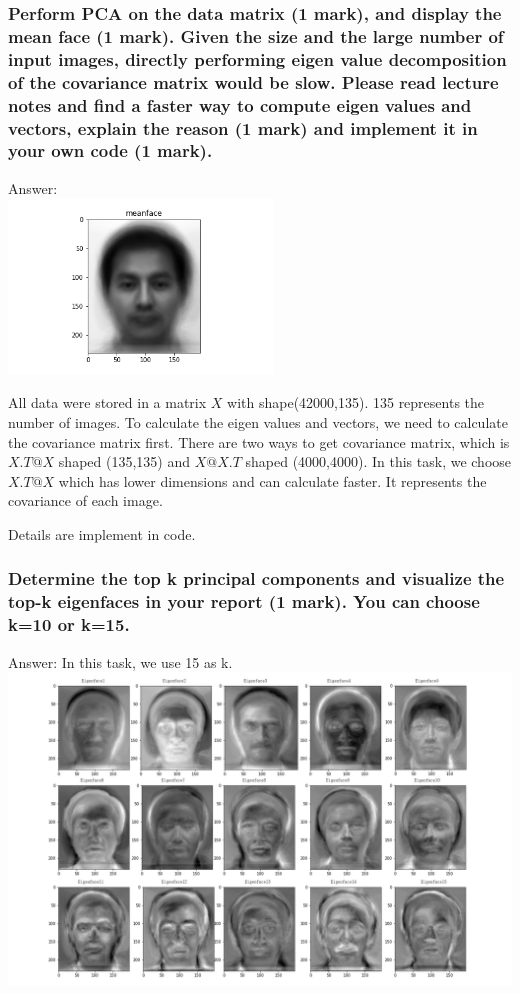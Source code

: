\documentclass[]{article}
\begin{document}
\subsubsection{Perform PCA on the data matrix (1 mark), and display the mean face (1 mark). Given the size and the large number of input images, directly performing eigen value decomposition of the covariance matrix would be slow. Please read lecture notes and find a faster way to compute eigen values and vectors, explain the reason (1 mark) and implement it in your own code (1 mark).}
Answer:\\
\includegraphics[width=7cm]{meanface.png}

All data were stored in a matrix $X$ with shape(42000,135). 135 represents the number of images. To calculate the eigen values and vectors, we need to calculate the covariance matrix first. There are two ways to get covariance matrix, which is $X.T@X$ shaped (135,135) and $X@X.T$ shaped (4000,4000). In this task, we choose $X.T@X$ which has lower dimensions and can calculate faster. It represents the covariance of each image.

Details are implement in code.
\subsubsection{Determine the top k principal components and visualize the top-k eigenfaces in your report (1 mark). You can choose k=10 or k=15.}
Answer: In this task, we use 15 as k.\\
\includegraphics[width=15cm]{eigenfaces.jpg}
\end{document}
